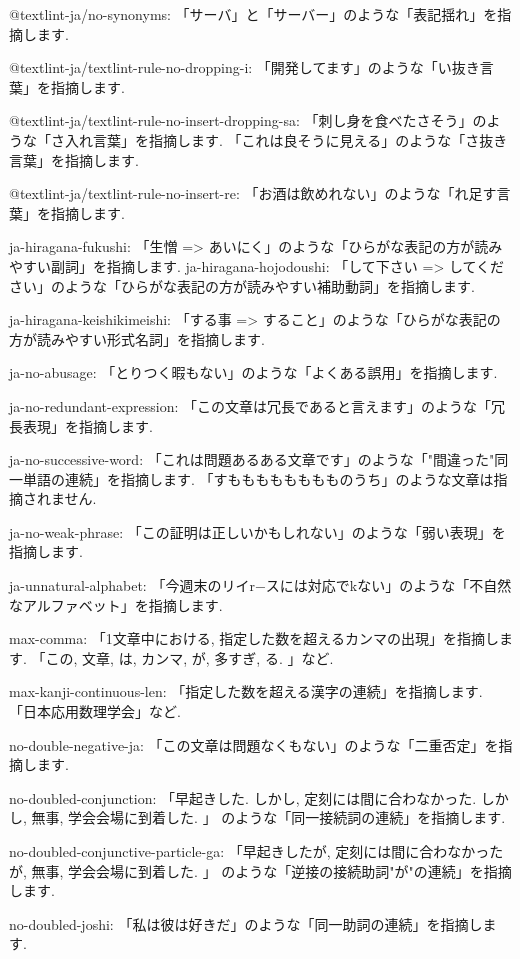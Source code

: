 @textlint-ja/no-synonyms:
「サーバ」と「サーバー」のような「表記揺れ」を指摘します. 

@textlint-ja/textlint-rule-no-dropping-i:
「開発してます」のような「い抜き言葉」を指摘します. 

@textlint-ja/textlint-rule-no-insert-dropping-sa:
「刺し身を食べたさそう」のような「さ入れ言葉」を指摘します. 
「これは良そうに見える」のような「さ抜き言葉」を指摘します. 

@textlint-ja/textlint-rule-no-insert-re:
「お酒は飲めれない」のような「れ足す言葉」を指摘します. 

ja-hiragana-fukushi:
「生憎 => あいにく」のような「ひらがな表記の方が読みやすい副詞」を指摘します. 
ja-hiragana-hojodoushi:
「して下さい => してください」のような「ひらがな表記の方が読みやすい補助動詞」を指摘します. 

ja-hiragana-keishikimeishi:
「する事 => すること」のような「ひらがな表記の方が読みやすい形式名詞」を指摘します. 

ja-no-abusage:
「とりつく暇もない」のような「よくある誤用」を指摘します. 

ja-no-redundant-expression:
「この文章は冗長であると言えます」のような「冗長表現」を指摘します. 

ja-no-successive-word:
「これは問題あるある文章です」のような「"間違った"同一単語の連続」を指摘します. 
「すもももももももものうち」のような文章は指摘されません. 

ja-no-weak-phrase:
「この証明は正しいかもしれない」のような「弱い表現」を指摘します. 

ja-unnatural-alphabet:
「今週末のリイr−スには対応でkない」のような「不自然なアルファベット」を指摘します. 

max-comma:
「1文章中における, 指定した数を超えるカンマの出現」を指摘します. 
「この, 文章, は, カンマ, が, 多すぎ, る. 」など. 

max-kanji-continuous-len:
「指定した数を超える漢字の連続」を指摘します. 
「日本応用数理学会」など. 

no-double-negative-ja:
「この文章は問題なくもない」のような「二重否定」を指摘します. 

no-doubled-conjunction:
「早起きした. しかし, 定刻には間に合わなかった. しかし, 無事, 学会会場に到着した. 」
のような「同一接続詞の連続」を指摘します. 

no-doubled-conjunctive-particle-ga:
「早起きしたが, 定刻には間に合わなかったが, 無事, 学会会場に到着した. 」
のような「逆接の接続助詞"が"の連続」を指摘します. 

no-doubled-joshi:
「私は彼は好きだ」のような「同一助詞の連続」を指摘します. 

